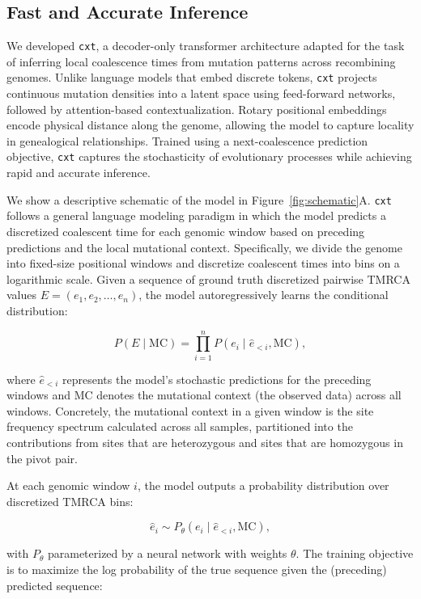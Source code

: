 \documentclass{article}
\newcommand{\cxtkit}{\texttt{cxt}\xspace}
\begin{document}
\subsection*{Fast and Accurate Inference}

We developed \cxtkit, a decoder-only transformer architecture adapted for the task of inferring local coalescence times from mutation patterns across recombining genomes. Unlike 
language models that embed discrete tokens, \cxtkit projects continuous mutation densities into a latent space using feed-forward networks, followed by attention-based contextualization. Rotary positional embeddings encode physical distance along the genome, allowing the model to capture locality in genealogical relationships. Trained using a next-coalescence prediction objective, \cxtkit captures the stochasticity of evolutionary processes while achieving rapid and accurate inference.


We show a descriptive schematic of the model in Figure~\ref{fig:schematic}A.  
\cxtkit follows a general language modeling paradigm in which the model predicts 
a discretized coalescent time for each genomic window based on preceding predictions 
and the local mutational context. Specifically, we divide the genome into fixed-size 
positional windows and discretize coalescent times into bins on a 
logarithmic scale. Given a sequence of ground truth discretized pairwise TMRCA values  
\( E = (e_1, e_2, \dots, e_n) \), the model autoregressively learns the conditional 
distribution:

\[
P(E \mid \text{MC}) = \prod_{i=1}^{n} P(e_i \mid \hat{e}_{<i}, \text{MC}),
\]
 
where \( \hat{e}_{<i} \) represents the model's stochastic predictions for the preceding windows and \( \text{MC} \) denotes the mutational context (the observed data) across all windows. Concretely, the mutational context in a given window is the site frequency spectrum calculated across all samples, partitioned into the contributions from sites that are heterozygous and sites that are homozygous in the pivot pair.

At each genomic window \( i \), the model outputs a probability distribution over 
discretized TMRCA bins:

\[
\hat{e}_i \sim P_\theta(e_i \mid \hat{e}_{<i}, \text{MC}),
\]

with \( P_\theta \) parameterized by a neural network with weights $\theta$. The training objective is to maximize the log probability of the true sequence given the (preceding) predicted sequence:
\end{document}
